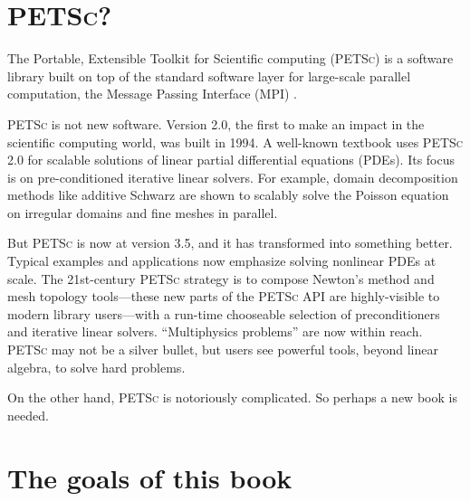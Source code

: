 \documentclass{tufte-book}
\theoremstyle{definition}
\newcommand{\PETSc}{\textsc{PETSc}\xspace}
\begin{document}
\section{\PETSc?}

The Portable, Extensible Toolkit for Scientific computing (\PETSc{}) \citep{petsc-user-ref} is a software library built on top of the standard software layer for large-scale parallel computation, the Message Passing Interface (MPI) \citep{Groppetal1999}.

\PETSc is not new software.  Version 2.0, the first to make an impact in the scientific computing world, was built in 1994.  A well-known textbook \citet{Smithetal1996} uses \PETSc 2.0 for scalable solutions of linear partial differential equations (PDEs).  Its focus is on pre-conditioned iterative linear solvers.  For example, domain decomposition methods like additive Schwarz are shown to scalably solve the Poisson equation on irregular domains and fine meshes in parallel.

But \PETSc is now at version 3.5, and it has transformed into something better.  Typical examples and applications now emphasize solving nonlinear PDEs at scale.  The 21st-century \PETSc strategy is to compose Newton's method and mesh topology tools---these new parts of the \PETSc API are highly-visible to modern library users---with a run-time chooseable selection of preconditioners and iterative linear solvers.  ``Multiphysics problems'' are now within reach.  \PETSc may not be a silver bullet, but users see powerful tools, beyond linear algebra, to solve hard problems.

On the other hand, \PETSc is notoriously complicated.  So perhaps a new book is needed.

\section{The goals of this book}
\end{document}
